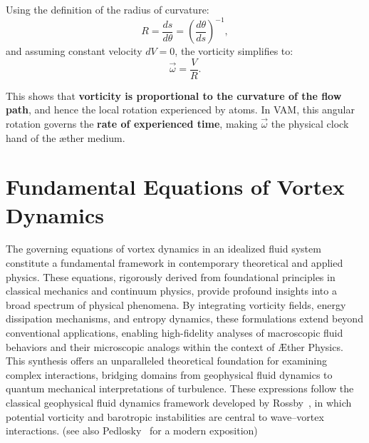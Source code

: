 \documentclass[a4paper,12pt]{article}
\begin{document}
    Using the definition of the radius of curvature:
    \begin{equation}
        R = \frac{ds}{d\theta} = \left( \frac{d\theta}{ds} \right)^{-1},
    \end{equation}
    and assuming constant velocity \(dV = 0\), the vorticity simplifies to:
    \begin{equation}
        \boxed{\vec{\omega} = \frac{V}{R}}.
    \end{equation}

    This shows that \textbf{vorticity is proportional to the curvature of the flow path}, and hence the local rotation experienced by atoms. In VAM, this angular rotation governs the \textbf{rate of experienced time}, making \(\vec{\omega}\) the physical clock hand of the æther medium.


        \section{Fundamental Equations of Vortex Dynamics}

    The governing equations of vortex dynamics in an idealized fluid system constitute a fundamental framework in contemporary theoretical and
    applied physics. These equations, rigorously derived from foundational principles in classical mechanics and continuum physics, provide
    profound insights into a broad spectrum of physical phenomena. By integrating vorticity fields, energy dissipation mechanisms, and entropy dynamics, these formulations extend beyond conventional applications, enabling high-fidelity analyses of macroscopic fluid behaviors and their microscopic analogs within the context of Æther Physics. This synthesis offers an unparalleled theoretical foundation for examining complex interactions, bridging domains from geophysical fluid dynamics to quantum mechanical interpretations of turbulence. These expressions follow the classical geophysical fluid dynamics framework developed by Rossby~\cite{rossby1939}, in which potential vorticity and barotropic instabilities are central to wave–vortex interactions. (see also Pedlosky~\cite{pedlosky1987} for a modern exposition)
\end{document}
